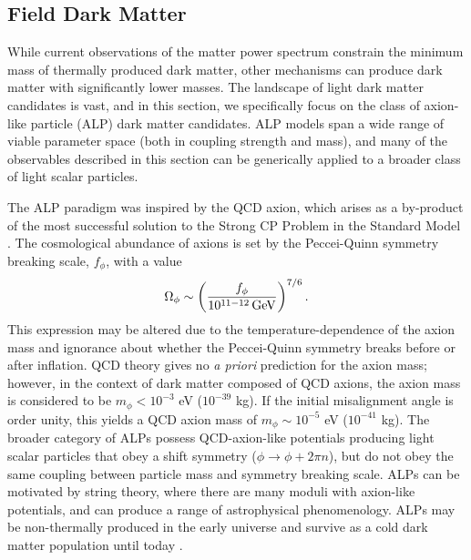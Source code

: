 \subsection{Field Dark Matter }
\label{sec:axions}

While current observations of the matter power spectrum constrain the minimum mass of thermally produced dark matter, other mechanisms can  produce dark matter with significantly lower masses. The landscape of light dark matter candidates is vast, and in this section, we specifically focus on the class of axion-like particle (ALP) dark matter candidates.
ALP models span a wide range of viable parameter space (both in coupling strength and mass), and many of the observables described in this section can be generically applied to a broader class of light scalar particles.

The ALP paradigm was inspired by the QCD axion, which arises as a by-product of the most successful solution to the Strong CP Problem in the Standard Model \citep{PecceiQuinn:1977}. 
The cosmological abundance of axions is set by the Peccei-Quinn symmetry breaking scale, $f_\phi$, with a value
\begin{equation}
\Omega_\phi\sim\left(\frac{f_\phi}{10^{11-12}\,{\rm GeV}}\right)^{7/6}.
\end{equation}
This expression may be altered due to the temperature-dependence of the axion mass and ignorance about whether the Peccei-Quinn symmetry breaks before or after inflation. 
QCD theory gives no {\it a priori} prediction for the axion mass; however, in the context of dark matter composed of QCD axions, the axion mass is considered to be $m_\phi< 10^{-3}$ eV ($10^{-39}$ kg). 
If the initial misalignment angle is order unity, this yields a QCD axion mass of $m_\phi \sim 10^{-5}$ eV ($10^{-41}$ kg).
The broader category of ALPs possess QCD-axion-like potentials producing light scalar particles that obey a shift symmetry ($\phi \rightarrow \phi + 2\pi n$), but do not obey the same coupling between particle mass and symmetry breaking scale. 
ALPs can be motivated by string theory, where there are many moduli with axion-like potentials, and can produce a range of astrophysical phenomenology.
ALPs may be non-thermally produced in the early universe and survive as a cold dark matter population until today \citep[\eg][]{Arias:2012az}.


